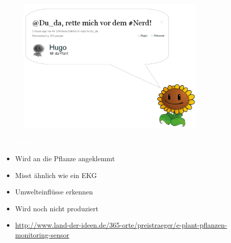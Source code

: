 \documentclass[bigger]{beamer}
\newcommand{\topic}[1]{{\huge{\textcolor{white}{\textbf{#1}}}}}
\begin{document}
{
%
\begin{frame}
\begin{figure}[H]
\includegraphics[width=350px]{SprechblaseOR.png}
\end{figure}

\end{frame}
}

\begin{frame}{\topic{E-Plant}}
	\begin{itemize}
		\item Wird an die Pflanze angeklemmt
		\item Misst ähnlich wie ein EKG
		\item Umwelteinflüsse erkennen
		\item Wird noch nicht produziert
		\item \url{http://www.land-der-ideen.de/365-orte/preistraeger/e-plant-pflanzen-monitoring-sensor}
	\end{itemize}
\end{frame}
\end{document}
